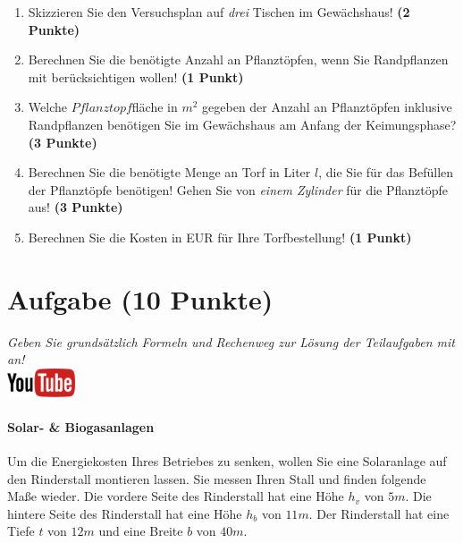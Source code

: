 \documentclass[a4paper, 9pt]{scrartcl}\usepackage[]{graphicx}\usepackage[]{xcolor}
\begin{document}
\begin{enumerate}
\item Skizzieren Sie den Versuchsplan auf \textit{drei} Tischen im
  Gew{\"a}chshaus! \textbf{(2 Punkte)}
\item Berechnen Sie die ben{\"o}tigte Anzahl an Pflanzt{\"o}pfen, wenn Sie
  Randpflanzen mit ber{\"u}cksichtigen wollen! \textbf{(1 Punkt)}
\item Welche $Pflanztopf$fl{\"a}che in $m^2$ gegeben der Anzahl an
  Pflanzt{\"o}pfen inklusive Randpflanzen ben{\"o}tigen Sie im Gew{\"a}chshaus am
  Anfang der Keimungsphase?  \textbf{(3 Punkte)}
\item Berechnen Sie die ben{\"o}tigte Menge an Torf in Liter $l$, die Sie f{\"u}r
  das Bef{\"u}llen der Pflanzt{\"o}pfe ben{\"o}tigen! Gehen Sie von \textit{einem
    Zylinder} f{\"u}r die Pflanzt{\"o}pfe aus!  \textbf{(3 Punkte)}
\item Berechnen Sie die Kosten in EUR f{\"u}r Ihre Torfbestellung! \textbf{(1
    Punkt)}
\end{enumerate}



 
\clearpage

\section{Aufgabe \hfill (10 Punkte)}

\textit{Geben Sie grunds{\"a}tzlich Formeln und Rechenweg zur L{\"o}sung der
  Teilaufgaben mit an!} \\[1Ex]

\hfill\href{https://youtu.be/aBxLkdF-c4M}{\includegraphics[width =
  2cm]{img/youtube}} %
\hspace{2Ex}

\paragraph{Solar- \& Biogasanlagen}



Um die Energiekosten Ihres Betriebes zu senken, wollen Sie eine Solaranlage
auf den Rinderstall montieren lassen. Sie messen Ihren Stall und finden
folgende Ma{\ss}e wieder. Die vordere Seite des Rinderstall hat eine H{\"o}he
$h_v$ von $5m$. Die hintere Seite des Rinderstall hat eine
H{\"o}he $h_b$ von $11m$. Der Rinderstall hat eine Tiefe $t$ von
$12m$ und eine Breite $b$ von $40m$.
\end{document}
